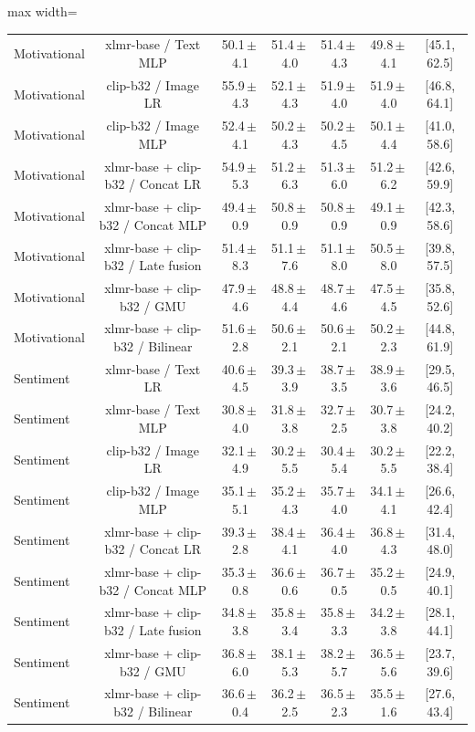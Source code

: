 \begin{table}[t]
\begin{adjustbox}{max width=\textwidth}
\begin{tabular}{lcccccc}
Motivational & xlmr-base / Text MLP & 50.1\,$\pm$\,4.1 & 51.4\,$\pm$\,4.0 & 51.4\,$\pm$\,4.3 & 49.8\,$\pm$\,4.1 & [45.1, 62.5] \\
Motivational & clip-b32 / Image LR & 55.9\,$\pm$\,4.3 & 52.1\,$\pm$\,4.3 & 51.9\,$\pm$\,4.0 & 51.9\,$\pm$\,4.0 & [46.8, 64.1] \\
Motivational & clip-b32 / Image MLP & 52.4\,$\pm$\,4.1 & 50.2\,$\pm$\,4.3 & 50.2\,$\pm$\,4.5 & 50.1\,$\pm$\,4.4 & [41.0, 58.6] \\
Motivational & xlmr-base + clip-b32 / Concat LR & 54.9\,$\pm$\,5.3 & 51.2\,$\pm$\,6.3 & 51.3\,$\pm$\,6.0 & 51.2\,$\pm$\,6.2 & [42.6, 59.9] \\
Motivational & xlmr-base + clip-b32 / Concat MLP & 49.4\,$\pm$\,0.9 & 50.8\,$\pm$\,0.9 & 50.8\,$\pm$\,0.9 & 49.1\,$\pm$\,0.9 & [42.3, 58.6] \\
Motivational & xlmr-base + clip-b32 / Late fusion & 51.4\,$\pm$\,8.3 & 51.1\,$\pm$\,7.6 & 51.1\,$\pm$\,8.0 & 50.5\,$\pm$\,8.0 & [39.8, 57.5] \\
Motivational & xlmr-base + clip-b32 / GMU & 47.9\,$\pm$\,4.6 & 48.8\,$\pm$\,4.4 & 48.7\,$\pm$\,4.6 & 47.5\,$\pm$\,4.5 & [35.8, 52.6] \\
Motivational & xlmr-base + clip-b32 / Bilinear & 51.6\,$\pm$\,2.8 & 50.6\,$\pm$\,2.1 & 50.6\,$\pm$\,2.1 & 50.2\,$\pm$\,2.3 & [44.8, 61.9] \\
Sentiment & xlmr-base / Text LR & 40.6\,$\pm$\,4.5 & 39.3\,$\pm$\,3.9 & 38.7\,$\pm$\,3.5 & 38.9\,$\pm$\,3.6 & [29.5, 46.5] \\
Sentiment & xlmr-base / Text MLP & 30.8\,$\pm$\,4.0 & 31.8\,$\pm$\,3.8 & 32.7\,$\pm$\,2.5 & 30.7\,$\pm$\,3.8 & [24.2, 40.2] \\
Sentiment & clip-b32 / Image LR & 32.1\,$\pm$\,4.9 & 30.2\,$\pm$\,5.5 & 30.4\,$\pm$\,5.4 & 30.2\,$\pm$\,5.5 & [22.2, 38.4] \\
Sentiment & clip-b32 / Image MLP & 35.1\,$\pm$\,5.1 & 35.2\,$\pm$\,4.3 & 35.7\,$\pm$\,4.0 & 34.1\,$\pm$\,4.1 & [26.6, 42.4] \\
Sentiment & xlmr-base + clip-b32 / Concat LR & 39.3\,$\pm$\,2.8 & 38.4\,$\pm$\,4.1 & 36.4\,$\pm$\,4.0 & 36.8\,$\pm$\,4.3 & [31.4, 48.0] \\
Sentiment & xlmr-base + clip-b32 / Concat MLP & 35.3\,$\pm$\,0.8 & 36.6\,$\pm$\,0.6 & 36.7\,$\pm$\,0.5 & 35.2\,$\pm$\,0.5 & [24.9, 40.1] \\
Sentiment & xlmr-base + clip-b32 / Late fusion & 34.8\,$\pm$\,3.8 & 35.8\,$\pm$\,3.4 & 35.8\,$\pm$\,3.3 & 34.2\,$\pm$\,3.8 & [28.1, 44.1] \\
Sentiment & xlmr-base + clip-b32 / GMU & 36.8\,$\pm$\,6.0 & 38.1\,$\pm$\,5.3 & 38.2\,$\pm$\,5.7 & 36.5\,$\pm$\,5.6 & [23.7, 39.6] \\
Sentiment & xlmr-base + clip-b32 / Bilinear & 36.6\,$\pm$\,0.4 & 36.2\,$\pm$\,2.5 & 36.5\,$\pm$\,2.3 & 35.5\,$\pm$\,1.6 & [27.6, 43.4] \\
\bottomrule
\end{tabular}
\end{adjustbox}
\end{table}
